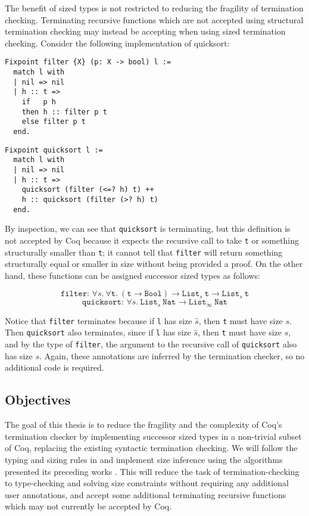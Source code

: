 \documentclass{article}
\begin{document}
The benefit of sized types is not restricted to reducing the fragility of termination checking. Terminating recursive functions which are not accepted using structural termination checking may instead be accepting when using sized termination checking. Consider the following implementation of quicksort:

\begin{multicols}{2}
\begin{verbatim}
Fixpoint filter {X} (p: X -> bool) l :=
  match l with
  | nil => nil
  | h :: t =>
    if   p h
    then h :: filter p t
    else filter p t
  end.
\end{verbatim}

\begin{verbatim}
Fixpoint quicksort l :=
  match l with
  | nil => nil
  | h :: t =>
    quicksort (filter (<=? h) t) ++ 
    h :: quicksort (filter (>? h) t)
  end.
\end{verbatim}
\end{multicols}

By inspection, we can see that \texttt{quicksort} is terminating, but this definition is not accepted by Coq because it expects the recursive call to take \texttt{t} or something structurally smaller than \texttt{t}; it cannot tell that \texttt{filter} will return something structurally equal or smaller in size without being provided a proof. On the other hand, these functions can be assigned successor sized types as follows:

$$\texttt{filter: } \forall s.\ \forall \texttt{t}.\ (\texttt{t} \rightarrow \texttt{Bool}) \rightarrow \texttt{List}_s\ \texttt{t} \rightarrow \texttt{List}_s\ \texttt{t}$$
$$\texttt{quicksort: } \forall s.\ \texttt{List}_s\ \texttt{Nat} \rightarrow \texttt{List}_\infty\ \texttt{Nat}$$

Notice that \texttt{filter} terminates because if \texttt{l} has size $\hat{s}$, then \texttt{t} must have size $s$. Then \texttt{quicksort} also terminates, since if \texttt{l} has size $\hat{s}$, then \texttt{t} must have size $s$, and by the type of \texttt{filter}, the argument to the recursive call of \texttt{quicksort} also has size $s$. Again, these annotations are inferred by the termination checker, so no additional code is required.

\subsection{Objectives}

The goal of this thesis is to reduce the fragility and the complexity of Coq's termination checker by implementing successor sized types in a non-trivial subset of Coq, replacing the existing syntactic termination checking. We will follow the typing and sizing rules in \cite{cic-hat-bar} and implement size inference using the algorithms presented its preceding works \cite{f-hat, cic-hat}. This will reduce the task of termination-checking to type-checking and solving size constraints without requiring any additional user annotations, and accept some additional terminating recursive functions which may not currently be accepted by Coq.
\end{document}
